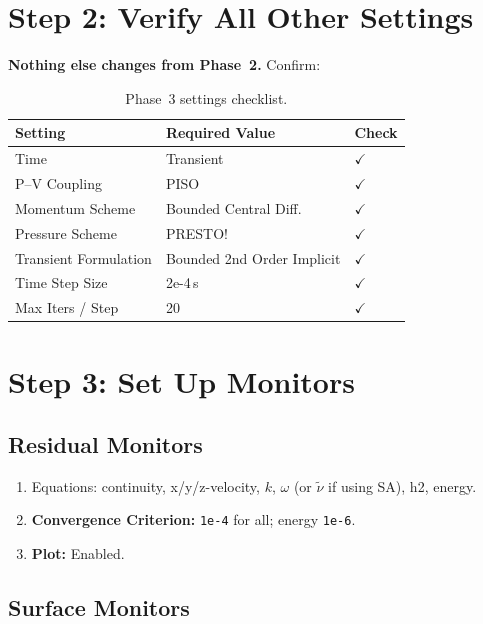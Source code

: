 \documentclass[12pt,a4paper]{report}
\begin{document}
\section{Step 2: Verify All Other Settings}

\textbf{Nothing else changes from Phase~2.}  Confirm:

\begin{table}[H]
\centering
\caption{Phase~3 settings checklist.}
\begin{tabular}{@{}lll@{}}
\toprule
\textbf{Setting} & \textbf{Required Value} & \textbf{Check} \\
\midrule
Time                   & Transient             & $\checkmark$ \\
P--V Coupling          & PISO                  & $\checkmark$ \\
Momentum Scheme        & Bounded Central Diff. & $\checkmark$ \\
Pressure Scheme        & PRESTO!               & $\checkmark$ \\
Transient Formulation  & Bounded 2nd Order Implicit & $\checkmark$ \\
Time Step Size         & 2e-4\,s               & $\checkmark$ \\
Max Iters / Step       & 20                    & $\checkmark$ \\
\bottomrule
\end{tabular}
\end{table}


\section{Step 3: Set Up Monitors}

\subsection{Residual Monitors}

\begin{enumerate}
  \item Equations: continuity, x/y/z-velocity, $k$, $\omega$ (or
        $\tilde{\nu}$ if using SA), h2, energy.
  \item \textbf{Convergence Criterion:} \texttt{1e-4} for all;
        energy \texttt{1e-6}.
  \item \textbf{Plot:} Enabled.
\end{enumerate}

\subsection{Surface Monitors}
\end{document}
